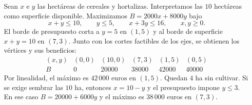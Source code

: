 Sean $x$ e $y$ las hectáreas de cereales y hortalizas. Interpretamos las $10$ hectáreas como superficie disponible. Maximizamos $B=2000x+8000y$ bajo
\[
x+y\le10,\qquad y\le5,\qquad x+3y\le16,\qquad x,y\ge0.
\]
El borde de presupuesto corta a $y=5$ en $(1,5)$ y al borde de superficie $x+y=10$ en $(7,3)$. Junto con los cortes factibles de los ejes, se obtienen los vértices y sus beneficios:
\[
\begin{array}{c|rrrrr}
(x,y)&(0,0)&(10,0)&(7,3)&(1,5)&(0,5)\\\hline
B&0&20000&38000&42000&40000
\end{array}
\]
Por linealidad, el máximo es $\boxed{42\,000\text{ euros}}$ en $(1,5)$. Quedan $4$ ha sin cultivar. Si se exige sembrar las $10$ ha, entonces $x=10-y$ y el presupuesto impone $y\le3$. En ese caso $B=20000+6000y$ y el máximo es $38\,000$ euros en $(7,3)$.
